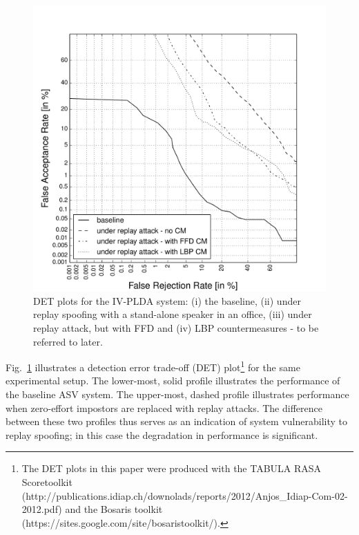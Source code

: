 \begin{figure}[!t]
	\centering
	\includegraphics[width=1\linewidth]{Figs/DET_IVPLDA_counter_Behr.pdf}
	\caption{DET plots for the IV-PLDA system: (i) the baseline, (ii) under replay spoofing with a stand-alone speaker in an office, (iii) under replay attack, but with FFD and (iv) LBP countermeasures - to be referred to later.}

	\label{fig::DETs_replay_IV}
\end{figure}


Fig.~\ref{fig::DETs_replay_IV} illustrates a detection error trade-off (DET) plot\footnote{The DET plots in this paper were produced with the TABULA RASA Scoretoolkit (http://publications.idiap.ch/downolads/reports/2012/Anjos\_Idiap-Com-02-2012.pdf) and the Bosaris toolkit (https://sites.google.com/site/bosaristoolkit/).} for the same experimental setup.  The lower-most, solid profile illustrates the performance of the baseline ASV system.  The upper-most, dashed profile illustrates performance when zero-effort impostors are replaced with replay attacks.  The difference between these two profiles thus serves as an indication of system vulnerability to replay spoofing; in this case the degradation in performance is significant.  


